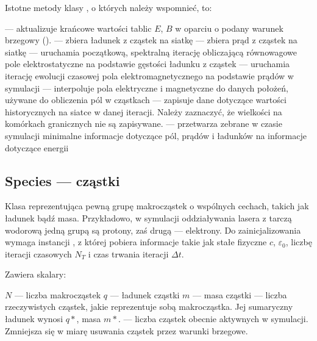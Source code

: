 Istotne metody klasy , o których należy wspomnieć, to:
\begin{itemize}
     \itemi{}  --- aktualizuje krańcowe wartości tablic $E$, $B$
         w oparciu o podany warunek brzegowy ().
     \itemi{}  --- zbiera ładunek z cząstek na siatkę
     \itemi{}  --- zbiera prąd z cząstek na siatkę
     \itemi{}  --- uruchamia początkową, spektralną iterację obliczającą równowagowe
           pole elektrostatyczne na podstawie gęstości ładunku z cząstek
     \itemi{}  --- uruchamia iterację ewolucji czasowej pola elektromagnetycznego na podstawie
           prądów w symulacji
     \itemi{}  --- interpoluje pola elektryczne i magnetyczne do danych położeń, używane
           do obliczenia pól w cząstkach
     \itemi{}  --- zapisuje dane dotyczące wartości historycznych na siatce w danej iteracji.
           Należy zaznaczyć, że wielkości na komórkach granicznych nie są zapisywane.
     \itemi{}  --- przetwarza zebrane w czasie symulacji minimalne informacje dotyczące pól, prądów i ładunków
           na informacje dotyczące energii
\end{itemize}

\subsection{Species --- cząstki}
Klasa reprezentująca pewną grupę makrocząstek o wspólnych cechach, takich
jak ładunek bądź masa.  Przykładowo, w symulacji oddziaływania lasera z
tarczą wodorową jedną grupą są protony, zaś drugą --- elektrony.  Do
zainicjalizowania wymaga instancji , z której pobiera informacje
takie jak stałe fizyczne $c$, $\varepsilon_0$, liczbę iteracji czasowych
$N_T$ i czas trwania iteracji $\Delta t$.

Zawiera skalary:
\begin{itemize}
    \itemi{} $N$ --- liczba makrocząstek
    \itemi{} $q$ --- ładunek cząstki
    \itemi{} $m$ --- masa cząstki
    \itemi{}  --- liczba rzeczywistych cząstek, jakie reprezentuje
        sobą makrocząstka. Jej sumaryczny ładunek wynosi $q *
        $, masa $m * $.
    \itemi{}  --- liczba cząstek obecnie aktywnych w symulacji.
        Zmniejsza się w miarę usuwania cząstek przez warunki brzegowe.
\end{itemize}

